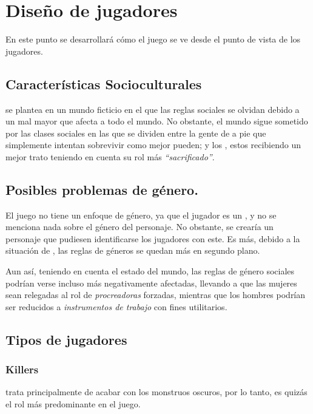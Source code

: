 
\section{Diseño de jugadores}
    En este punto se desarrollará cómo el juego se ve desde el punto de vista de los jugadores.
    \subsection{Características Socioculturales}
        \TWD se plantea en un mundo ficticio en el que las
        reglas sociales se olvidan debido a un mal mayor que afecta a todo el mundo. No obstante, el mundo sigue sometido por las clases sociales en las que se dividen entre la gente de a pie que simplemente intentan sobrevivir como mejor pueden; y los \hunters, estos recibiendo un mejor trato teniendo en cuenta su rol más \textit{“sacrificado”}.
    \subsection{Posibles problemas de género.}
        El juego no tiene un enfoque de género, ya que el jugador es un \hunter, y no se menciona nada sobre el género del personaje. No obstante, se crearía un personaje que pudiesen identificarse los jugadores con este. Es más, debido a la situación de \humanity, las reglas de géneros se quedan más en segundo plano.

        Aun así, teniendo en cuenta el estado del mundo, las reglas de género sociales podrían verse incluso más negativamente afectadas, llevando a que las mujeres sean relegadas al rol de \textit{procreadoras} forzadas, mientras que los hombres podrían ser reducidos a \textit{instrumentos de trabajo} con fines utilitarios.
    \subsection{Tipos de jugadores}
        \subsubsection{Killers}
            \TWD trata principalmente de acabar con los monstruos oscuros, por lo tanto, es quizás el rol más predominante en el juego.
